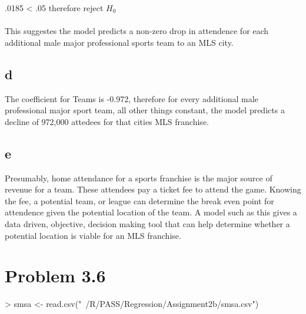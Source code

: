 \documentclass{article}
\begin{document}
.0185 < .05 therefore reject $H_0$
\\\\
This suggestes the model predicts a non-zero drop in attendence for each additional male major professional sports team to an MLS city. 

\subsection*{d}
The coefficient for Teams is -0.972, therefore for every additional male professional major sport team, all other things constant, the model predicts a decline of 972,000 attedees for that cities MLS franchise. 

\subsection*{e}
Presumably, home attendance for a sports franchise is the major source of revenue for a team. These attendees pay a ticket fee to attend the game. Knowing the fee, a potential team, or league can determine the break even point for attendence given the potential location of the team. A model such as this gives a data driven, objective, decision making tool that can help determine whether a potential location is viable for an MLS franchise.  

\section*{Problem 3.6}
\begin{Schunk}
\begin{Sinput}
> smsa <- read.csv("~/R/PASS/Regression/Assignment2b/smsa.csv")
\end{Sinput}
\end{Schunk}
\end{document}
